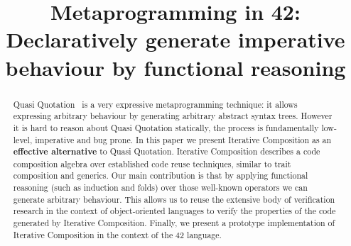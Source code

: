 \documentclass[english]{llncs}
\newcommand\saveSpace{\vspace{-1.1ex}}
\begin{document}
%
\frontmatter          %
%
\pagestyle{headings}  %
%

\mainmatter              %
%
\title{Metaprogramming in 42:
Declaratively generate imperative behaviour by functional reasoning}
%
%
%
%
%

\maketitle              %

\begin{abstract}
\saveSpace
Quasi Quotation~\cite{moggi1999idealized,pitman1980special,sheard2002template} is a very expressive metaprogramming technique: it allows expressing arbitrary behaviour by
generating arbitrary abstract syntax trees.
However it is hard to reason about Quasi Quotation statically,
the process is fundamentally low-level, imperative and bug prone.
In this paper we present Iterative Composition as
an \textbf{effective alternative} to Quasi Quotation.
Iterative Composition describes a code composition algebra over established code reuse techniques,
similar to trait composition and generics.
Our main contribution is that by applying functional reasoning (such as induction and folds)
over those well-known operators we can generate arbitrary behaviour.
This allows us to reuse the extensive body of verification research in the 
context of object-oriented languages to verify the properties
of the code generated by Iterative Composition.
Finally, we present a prototype implementation of Iterative Composition in the context of the 42 language.


%
%
%


\end{abstract}








\end{document}
